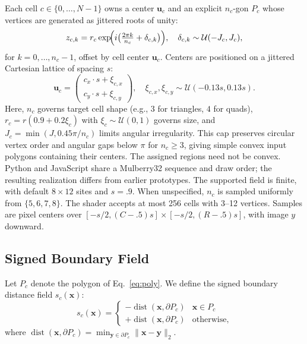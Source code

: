 \documentclass[sigconf,nonacm]{acmart}
\begin{document}
Each cell $c \in \{0,\dots,N-1\}$ owns a center $\mathbf{u}_c$ and an explicit
$n_c$-gon $P_c$ whose vertices are generated as jittered roots of unity:
\begin{equation}
z_{c,k} = r_c\exp\!\Bigl(i\bigl(\tfrac{2\pi k}{n_c}+\delta_{c,k}\bigr)\Bigr),
\quad \delta_{c,k}\sim\mathcal{U}(-J_c,J_c),
\label{eq:poly}
\end{equation}
for $k = 0,\dots,n_c-1$, offset by cell center $\mathbf{u}_c$. Centers are
positioned on a jittered Cartesian lattice of spacing $s$:
\begin{equation}
\mathbf{u}_c = \begin{pmatrix} c_x \cdot s + \xi_{c,x} \\ c_y \cdot s + \xi_{c,y} \end{pmatrix},
\quad \xi_{c,x}, \xi_{c,y} \sim \mathcal{U}(-0.13s, 0.13s).
\end{equation}
Here, $n_c$ governs target cell shape (e.g., $3$ for triangles, $4$ for quads),
$r_c=r(0.9+0.2\xi_c)$ with $\xi_c\sim\mathcal U(0,1)$ governs size, and
$J_c=\min(J,0.45\pi/n_c)$ limits angular irregularity. This cap preserves
circular vertex order and angular gaps below $\pi$ for $n_c\ge3$, giving
simple convex input polygons containing their centers. The assigned regions
need not be convex. Python and JavaScript share a Mulberry32 sequence and
draw order; the resulting realization differs from earlier prototypes.
The supported field is finite, with default $8\times12$ sites and $s=.9$. When unspecified, $n_c$ is sampled uniformly from $\{5,6,7,8\}$.
The shader accepts at most 256 cells with 3--12 vertices. Samples are pixel
centers over $[-s/2,(C-.5)s]\times[-s/2,(R-.5)s]$, with image $y$ downward.

\subsection{Signed Boundary Field}
\label{sec:signed}

Let $P_c$ denote the polygon of Eq.~\ref{eq:poly}. We define the signed boundary
distance field $s_c(\mathbf{x})$:
\begin{equation}
s_c(\mathbf{x}) =
\begin{cases}
-\operatorname{dist}(\mathbf{x},\partial P_c) & \mathbf{x}\in P_c\\
+\operatorname{dist}(\mathbf{x},\partial P_c) & \text{otherwise,}
\end{cases}
\label{eq:sdf}
\end{equation}
where $\operatorname{dist}(\mathbf{x},\partial P_c) = \min_{\mathbf{y}\in\partial P_c} \lVert\mathbf{x}-\mathbf{y}\rVert_2$.
\end{document}
